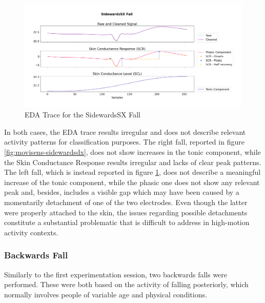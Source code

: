 \begin{figure}[h!]
    \centering
    \includegraphics[width=\textwidth]{./images/movisens/SidewardsSX.png}
    \caption{EDA Trace for the SidewardsSX Fall}
    \label{fig:movisens-sidewardssx}
\end{figure}

In both cases, the EDA trace results irregular and does not describe relevant activity patterns for classification purposes. The right fall, reported in figure \ref{fig:movisens-sidewardsdx}, does not show increases in the tonic component, while the Skin Conductance Response results irregular and lacks of clear peak patterns. The left fall, which is instead reported in figure \ref{fig:movisens-sidewardssx}, does not describe a meaningful increase of the tonic component, while the phasic one does not show any relevant peak and, besides, includes a visible gap which may have been caused by a momentarily detachment of one of the two electrodes. Even though the latter were properly attached to the skin, the issues regarding possible detachments constitute a substantial problematic that is difficult to address in high-motion activity contexts.

\subsubsection{Backwards Fall}\label{subsubsec:backwards-fall}

Similarly to the first experimentation session, two backwards falls were performed. These were both based on the activity of falling posteriorly, which normally involves people of variable age and physical conditions.

